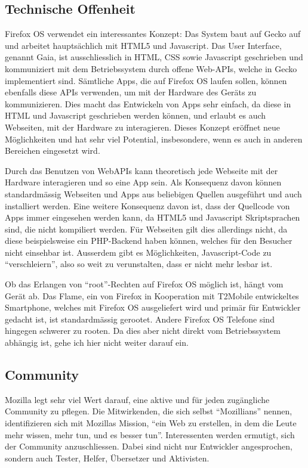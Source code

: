 \subsection{Technische Offenheit}
Firefox OS verwendet ein interessantes Konzept: Das System baut auf Gecko auf und arbeitet hauptsächlich mit HTML5 und Javascript. Das User Interface, genannt Gaia, ist ausschliesslich in HTML, CSS sowie Javascript geschrieben und kommuniziert mit dem Betriebssystem durch offene Web-APIs, welche in Gecko implementiert sind\thinspace\cite{online:ff-gaia}. Sämtliche Apps, die auf Firefox OS laufen sollen, können ebenfalls diese APIs verwenden, um mit der Hardware des Geräts zu kommunizieren\thinspace\cite{online:ff-webapi}. Dies macht das Entwickeln von Apps sehr einfach, da diese in HTML und Javascript geschrieben werden können\thinspace\cite{online:ff-apps}, und erlaubt es auch Webseiten, mit der Hardware zu interagieren. Dieses Konzept eröffnet neue Möglichkeiten und hat sehr viel Potential, insbesondere, wenn es auch in anderen Bereichen eingesetzt wird.

Durch das Benutzen von WebAPIs kann theoretisch jede Webseite mit der Hardware interagieren und so eine App sein. Als Konsequenz davon können standardmässig Webseiten und Apps aus beliebigen Quellen ausgeführt und auch installiert werden. Eine weitere Konsequenz davon ist, dass der Quellcode von Apps immer eingesehen werden kann, da HTML5 und Javascript Skriptsprachen sind, die nicht kompiliert werden. Für Webseiten gilt dies allerdings nicht, da diese beispielsweise ein PHP-Backend haben können, welches für den Besucher nicht einsehbar ist. Ausserdem gibt es Möglichkeiten, Javascript-Code zu ``verschleiern'', also so weit zu verunstalten, dass er nicht mehr lesbar ist\thinspace\cite{online:yui-compressor}.

Ob das Erlangen von ``root''-Rechten auf Firefox OS möglich ist, hängt vom Gerät ab. Das Flame, ein von Firefox in Kooperation mit T2Mobile entwickeltes Smartphone, welches mit Firefox OS ausgeliefert wird und primär für Entwickler gedacht ist\thinspace\cite{online:ff-flame}, ist standardmässig gerootet\thinspace\cite{irc:fxos}.
Andere Firefox OS Telefone sind hingegen schwerer zu rooten\thinspace\cite{irc:fxos}. Da dies aber nicht direkt vom Betriebssystem abhängig ist, gehe ich hier nicht weiter darauf ein.
\newline

\subsection{Community}
Mozilla legt sehr viel Wert darauf, eine aktive und für jeden zugängliche Community zu pflegen\thinspace\cite{online:mozilla-volunteer}. Die Mitwirkenden, die sich selbst ``Mozillians'' nennen, identifizieren sich mit Mozillas Mission, ``ein Web zu erstellen, in dem die Leute mehr wissen, mehr tun, und es besser tun''\thinspace\cite{online:mozilla-community}. 
Interessenten werden ermutigt, sich der Community anzuschliessen. Dabei sind nicht nur Entwickler angesprochen, sondern auch Tester, Helfer, Übersetzer und Aktivisten\thinspace\cite{online:mozilla-get-involved}. 

